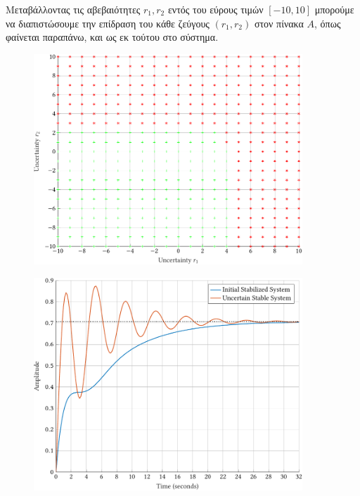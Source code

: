 Μεταβάλλοντας τις αβεβαιότητες \( r_1, r_2 \) εντός του εύρους τιμών \( [-10,
10] \) μπορούμε να διαπιστώσουμε την επίδραση του κάθε ζεύγους \( (r_1, r_2) \)
στον πίνακα \( A \), όπως φαίνεται παραπάνω, και ως εκ τούτου στο σύστημα.
\begin{figure}[h]
    \centering
    \includegraphics[width=0.9\textwidth]{figures/uncert_r.pdf}
    \label{fig:uncert_r}
\end{figure}
\begin{figure}[h]
    \centering
    \includegraphics[width=0.9\textwidth]{figures/uncert_step.pdf}
    \label{fig:uncert_step}
\end{figure}

